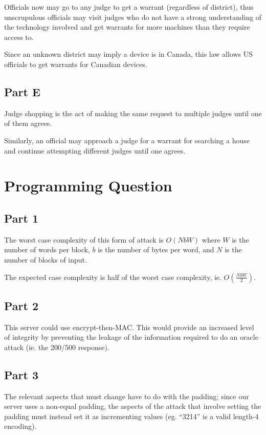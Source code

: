 \documentclass[12pt]{article}
\begin{document}
Officials now may go to any judge to get a warrant (regardless of district), thus unscrupulous officials may visit judges who do not have a strong understanding of the technology involved and get warrants for more machines than they require access to.

Since an unknown district may imply a device is in Canada, this law allows US officials to get warrants for Canadian devices.

\subsection*{Part E}
Judge shopping is the act of making the same request to multiple judges until one of them agrees.

Similarly, an official may approach a judge for a warrant for searching a house and continue attempting different judges until one agrees.

\section*{Programming Question}
\subsection*{Part 1}
The worst case complexity of this form of attack is $O(NbW)$ where $W$ is the number of words per block, $b$ is the number of bytes per word, and $N$ is the number of blocks of input.

The expected case complexity is half of the worst case complexity, ie. $O(\frac{NbW}{2})$.

\subsection*{Part 2}
This server could use encrypt-then-MAC. This would provide an increased level of integrity by preventing the leakage of the information required to do an oracle attack (ie. the 200/500 response).

\subsection*{Part 3}
The relevant aspects that must change have to do with the padding; since our server uses a non-equal padding, the aspects of the attack that involve setting the padding must instead set it as incrementing values (eg. ``3214'' is a valid length-4 encoding).
\end{document}
